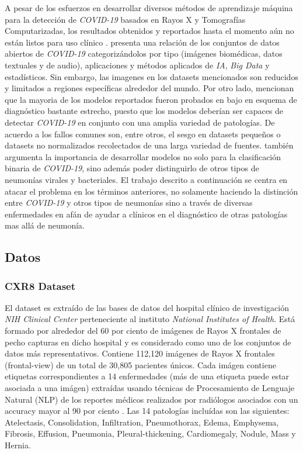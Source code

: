 A pesar de los esfuerzos en desarrollar diversos métodos de aprendizaje máquina para la detección de
\textit{COVID-19} basados en Rayos X y Tomografías Computarizadas, los resultados obtenidos y
reportados hasta el momento aún no están listos para uso clínico \cite{roberts2021common}.
\citeauthor*{shuja2021covid} presenta una relación de los conjuntos de datos abiertos de
\textit{COVID-19} categorizándolos por tipo (imágenes biomédicas,
datos textuales y de audio), aplicaciones y métodos aplicados de \textit{IA}, \textit{Big Data} y
estadísticos. Sin embargo, las imagenes en los datasets mencionados son reducidos y limitados a
regiones específicas alrededor del mundo. Por otro lado, \citeauthor{greenspan2020position} mencionan
que la mayoria de los modelos reportados fueron probados en bajo en esquema de diagnóstico bastante
estrecho, puesto que los modelos deberían ser capaces de detectar \textit{COVID-19} en conjunto
con una amplia variedad de patologías. De acuerdo a \citeauthor{roberts2021common} los fallos comunes
son, entre otros, el sesgo en datasets pequeños o datasets no normalizados recolectados de una larga
variedad de fuentes. \citeauthor{roberts2021common} también argumenta la importancia de desarrollar
modelos no solo para la clasificación binaria de \textit{COVID-19}, sino además poder distinguirlo
de otros tipos de neumonías virales y bacteriales. El trabajo descrito a continuación se centra en
atacar el problema en los términos anteriores, no solamente haciendo la distinción entre
\textit{COVID-19} y otros tipos de neumonías sino a través de diversas enfermedades en afán de ayudar
a clínicos en el diagnóstico de otras patologías mas allá de neumonía.


\subsection{Datos}

\subsubsection{CXR8 Dataset}

El dataset es extraído de las bases de datos del hospital clínico de investigación \textit{NIH
Clinical Center} perteneciente al instituto \textit{National Institutes of Health}. Está formado por
alrededor del 60 por ciento de imágenes de Rayos X frontales de pecho capturas en dicho hospital y
es considerado como uno de los conjuntos de datos más representativos. Contiene
112,120 imágenes de Rayos X frontales (frontal-view) de un total de 30,805 pacientes únicos. Cada
imágen contiene etiquetas correspondientes a 14 enfermedades (más de una etiqueta puede estar
asociada a una imágen) extraídas usando técnicas de
Procesamiento de Lenguaje Natural (NLP) de los reportes médicos realizados por radiólogos asociados
con un accuracy mayor al 90 por ciento \cite{8099852}. Las 14 patologías incluídas son las
siguientes: Atelectasis, Consolidation, Infiltration, Pneumothorax, Edema, Emphysema, Fibrosis,
Effusion, Pneumonia, Pleural-thickening, Cardiomegaly, Nodule, Mass y Hernia.

